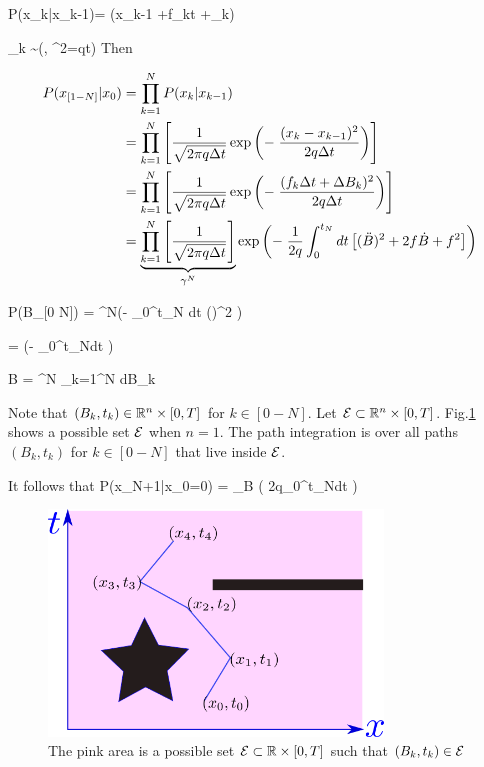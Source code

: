 \beq\color{blue}
P(x_k|x_{k-1})= \indi(x_{k-1}
+f_k\Delta t +\Delta\rvB_k)
\eeq

\beq \color{blue}
\Delta\rvB_k \sim \caln(, \s^2=q\Delta t)
\eeq
Then

\begin{align}
P(x_{[1- N]}|x_0)&=
\prod_{k=1}^N P(x_k|x_{k-1})
\\
&=
\prod_{k=1}^N
\left[
\frac{1}{\sqrt{2\pi q\Delta t}}
\exp\left(
-\;
\frac{(x_k-x_{k-1})^2}{2q\Delta t}
\right)
\right]
\\
&=
\prod_{k=1}^N
\left[
\frac{1}{\sqrt{2\pi q \Delta t}}
\exp\left(
-\;
\frac{(f_k\Delta t + \Delta B_k)^2}{2q\Delta t}
\right)
\right]
\\
&=
\underbrace{\prod_{k=1}^N
\left[
\frac{1}{\sqrt{2\pi q \Delta t}}
\right]}_{\gamma^N}
\exp\left(
-\;
\frac{1}
{2q}\int_0^{t_N}dt
\left[(\ddot{B})^2 +
2f\dot{B} +f^2\right]
\right)
\end{align}



\beq
P(B_{[0 \upto N]})
=
\gamma^N\exp\left(-\;
\int_0^{t_N} dt ()^2
\right)
\eeq

\beq
{}=
\exp\left(-\;
\int_0^{t_N}dt
\right)
\label{eq-px-div-pb}
\eeq

\beq
\cald B = \gamma^N \prod_{k=1}^N dB_k
\eeq

Note that
$(B_k, t_k)\in { \mathbb{R}}^n\times [0, T]$
for $k\in[0-N]$.
Let
${\cal E}\subset { \mathbb{R}}^n\times [0, T]$. 
Fig.\ref{fig-possible-paths}
shows a possible set ${\cal E}$
when $n=1$.
The path integration is over all
paths $(B_k, t_k)$ for $k\in [0-N]$
that live inside ${\cal E}$.

It follows that
\beq
P(x_{N+1}|x_0=0)  =
\int_{\cale}\cald B\;
\exp\left(
{2q}\int_0^{t_N}dt
\right)
\eeq


\begin{figure}[h!]
\centering
\includegraphics[width=3.5in]
{stochastic-diff-eqns/possible-paths.png}
\caption{The pink area is a possible set 
${\cal E}\subset{ \mathbb{R}}\times [0,T]$
such that  $(B_k, t_k)\in {\cal E}$
}
\label{fig-possible-paths}
\end{figure}


